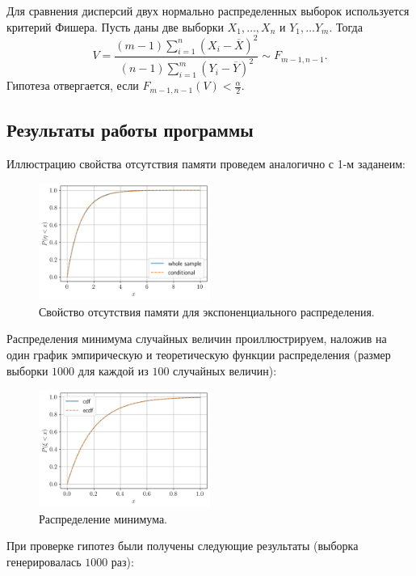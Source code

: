 \documentclass[12pt, a4paper]{article} %
\begin{document}
Для сравнения дисперсий двух нормально распределенных выборок используется критерий Фишера.
Пусть даны две выборки $X_1,\ldots ,X_n$ и  $Y_1,\ldots Y_m$. 
Тогда 
\[
    V = \frac{(m-1)\sum\limits_{i=1}^{n} (X_i - \overline{X})^2}{(n-1)\sum\limits_{i=1}^{m} (Y_i - \overline{Y})^2}
    \sim F_{m-1, n-1}.
\] 
Гипотеза отвергается, если $F_{m-1,n-1}(V) < \frac{\alpha}{2}$.

\subsection{Результаты работы программы}

Иллюстрацию свойства отсутствия памяти проведем аналогично с 1-м заданеим:
\begin{figure}[H]
    \centering
    \includegraphics[width=0.5\textwidth]{figures/03_mem.png}
    \caption{Свойство отсутствия памяти для экспоненциального распределения.}
    \label{fig:03_mem}
\end{figure}

Распределения минимума случайных величин проиллюстрируем, 
наложив на один график эмпирическую и теоретическую функции распределения (размер выборки $1000$ для каждой из  $100$ случайных величин):
\begin{figure}[H]
    \centering
    \includegraphics[width=0.5\textwidth]{figures/03_cdfmin.png}
    \caption{Распределение минимума.}
    \label{fig:03_cdfmin}
\end{figure}

При проверке гипотез были получены следующие результаты (выборка генерировалась $1000$ раз):
\end{document}
